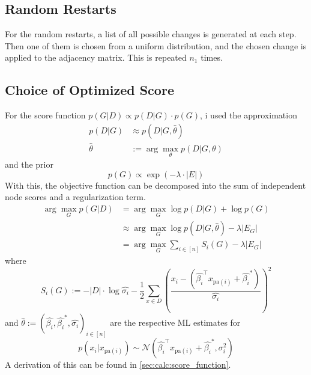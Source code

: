 \documentclass[sigconf, fleqn, prologue, dvipsnames]{acmart}
\newcommand{\abs}[1]{\left\vert #1 \right\vert}
\def\T{\top}
\def\pa{\text{pa}}
\begin{document}
\subsection{Random Restarts}
For the random restarts, a list of all possible changes is generated at each step.
Then one of them is chosen from a uniform distribution, and the chosen change is applied to the adjacency matrix.
This is repeated $n_1$ times.


\subsection{Choice of Optimized Score}
For the score function $p(G | D) \propto p(D | G) \cdot p(G)$, i used the approximation
\begin{align*}
	p(D | G)     & \approx p(D | G, \hat{\theta})               \\
	\hat{\theta} & := \arg\max\limits_{\theta} p(D | G, \theta)
\end{align*}
and the prior
$$p(G) \propto \exp\left(-\lambda \cdot \abs{E}\right)$$
With this, the objective function can be decomposed into the sum of independent node scores and a regularization term.
\begin{align*}
	\arg\max\limits_G p(G | D) & = \arg\max\limits_G \log p(D | G) + \log p(G)                             \\
	                           & \approx \arg\max\limits_G \log p(D | G, \hat{\theta}) - \lambda \abs{E_G} \\
	                           & = \arg\max\limits_G \sum\limits_{i \in [n]} S_i(G) - \lambda \abs{E_G}
\end{align*}
where
$$S_i(G) := -\abs{D} \cdot \log \hat{\sigma_i} - \frac{1}{2} \sum\limits_{x \in D} \left(\frac{x_i - (\hat{\beta_i}^\T x_{\pa(i)} + \hat{\beta_i}^*)}{\hat{\sigma_i}}\right)^2$$
and $\hat{\theta} := \left(\hat{\beta_i}, \hat{\beta_i}^*, \hat{\sigma_i}\right)_{i \in [n]}$ are the respective ML estimates for
$$p(x_i | x_{\pa(i)}) \sim \mathcal{N}(\hat{\beta_i}^\T x_{\pa(i)} + \hat{\beta_i}^*, \sigma_i^2)$$
A derivation of this can be found in \autoref{sec:calc:score_function}.
\end{document}
